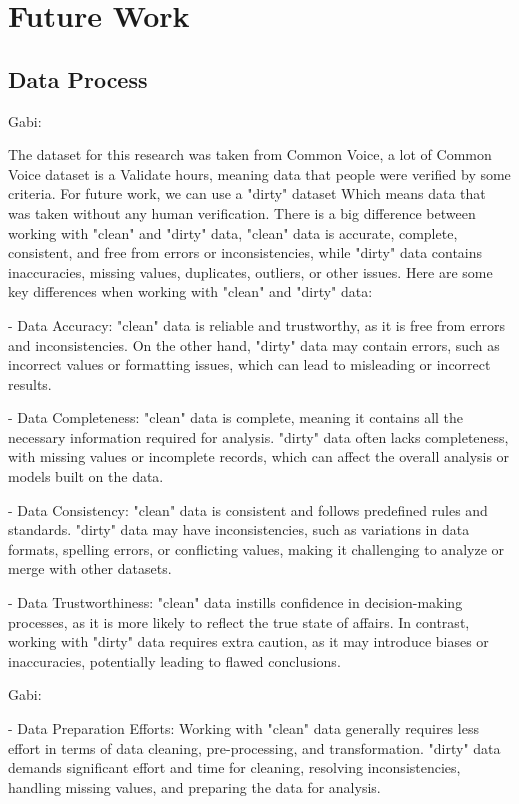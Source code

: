 \documentclass[a4paper]{article}
\begin{document}
\section{Future Work}
\subsection{Data Process}

Gabi:

The dataset for this research was taken from Common Voice, a lot of Common Voice dataset is a Validate hours, meaning data that people were verified by some criteria. For future work, we can use a "dirty" dataset Which means data that was taken without any human verification. There is a big difference between working with "clean" and "dirty" data, "clean" data is accurate, complete, consistent, and free from errors or inconsistencies, while "dirty" data contains inaccuracies, missing values, duplicates, outliers, or other issues. Here are some key differences when working with "clean" and "dirty" data:

- Data Accuracy: "clean" data is reliable and trustworthy, as it is free from errors and inconsistencies. On the other hand, "dirty" data may contain errors, such as incorrect values or formatting issues, which can lead to misleading or incorrect results.

- Data Completeness: "clean" data is complete, meaning it contains all the necessary information required for analysis. "dirty" data often lacks completeness, with missing values or incomplete records, which can affect the overall analysis or models built on the data.

- Data Consistency: "clean" data is consistent and follows predefined rules and standards. "dirty" data may have inconsistencies, such as variations in data formats, spelling errors, or conflicting values, making it challenging to analyze or merge with other datasets.

- Data Trustworthiness: "clean" data instills confidence in decision-making processes, as it is more likely to reflect the true state of affairs. In contrast, working with "dirty" data requires extra caution, as it may introduce biases or inaccuracies, potentially leading to flawed conclusions.

Gabi:

- Data Preparation Efforts: Working with "clean" data generally requires less effort in terms of data cleaning, pre-processing, and transformation. "dirty" data demands significant effort and time for cleaning, resolving inconsistencies, handling missing values, and preparing the data for analysis.
\end{document}
